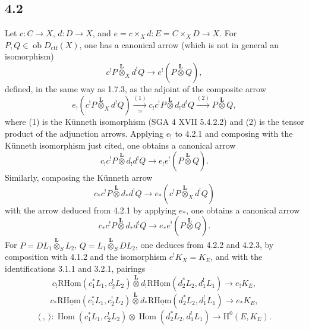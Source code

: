 \documentclass[11pt]{article}
\renewcommand{\H}{\mathrm{H}}
\DeclareMathOperator{\Hom}{Hom}
\newcommand{\ob}{\operatorname{ob}}
\providecommand{\Dctf}{D_{\mathrm{ctf}}}
\providecommand{\Dctf}{D_{\mathrm{ctf}}}
\providecommand{\Hom}{\operatorname{Hom}}
\providecommand{\ob}{\operatorname{ob}}
\providecommand{\Hom}{\operatorname{Hom}}
\begin{document}
\subsection*{4.2}
Let $c:C\to X$, $d:D\to X$, and $e=c\times_Xd:E=C\times_XD\to X$. For $P,Q\in\ob\Dctf(X)$, one has a canonical arrow (which is not in general an isomorphism)
\begin{equation}
c^!P\overset{\mathbf L}{\otimes}_X d^!Q
\longrightarrow e^!(P\overset{\mathbf L}{\otimes}Q),
\tag{4.2.1}
\end{equation}
defined, in the same way as 1.7.3, as the adjoint of the composite arrow
\[
e_!(c^!P\overset{\mathbf L}{\otimes}_X d^!Q)
\xrightarrow[\simeq]{(1)}
 c_!c^!P\overset{\mathbf L}{\otimes}d_!d^!Q
\xrightarrow{(2)} P\overset{\mathbf L}{\otimes}Q,
\]
where (1) is the Künneth isomorphism (SGA 4 XVII 5.4.2.2) and (2) is the tensor product of the adjunction arrows. Applying $e_!$ to 4.2.1 and composing with the Künneth isomorphism just cited, one obtains a canonical arrow
\begin{equation}
c_!c^!P\overset{\mathbf L}{\otimes}d_!d^!Q
\longrightarrow e_!e^!(P\overset{\mathbf L}{\otimes}Q).
\tag{4.2.2}
\end{equation}
Similarly, composing the Künneth arrow
\[
c_*c^!P\overset{\mathbf L}{\otimes}d_*d^!Q
\longrightarrow e_*(c^!P\overset{\mathbf L}{\otimes}_X d^!Q)
\]
with the arrow deduced from 4.2.1 by applying $e_*$, one obtains a canonical arrow
\begin{equation}
c_*c^!P\overset{\mathbf L}{\otimes}d_*d^!Q
\longrightarrow e_*e^!(P\overset{\mathbf L}{\otimes}Q).
\tag{4.2.3}
\end{equation}
For $P=DL_1\overset{\mathbf L}{\otimes}_S L_2$, $Q=L_1\overset{\mathbf L}{\otimes}_S DL_2$, one deduces from 4.2.2 and 4.2.3, by composition with 4.1.2 and the isomorphism $e^!K_X=K_E$, and with the identifications 3.1.1 and 3.2.1, pairings
\begin{equation}
c_!\mathrm{R}\underline{\mathrm{Hom}}(c_1^*L_1,c_2^!L_2)\overset{\mathbf L}{\otimes}
 d_!\mathrm{R}\underline{\mathrm{Hom}}(d_2^*L_2,d_1^!L_1)
\longrightarrow e_!K_E,
\tag{4.2.4}
\end{equation}
\begin{equation}
c_*\mathrm{R}\underline{\mathrm{Hom}}(c_1^*L_1,c_2^!L_2)\overset{\mathbf L}{\otimes}
 d_*\mathrm{R}\underline{\mathrm{Hom}}(d_2^*L_2,d_1^!L_1)
\longrightarrow e_*K_E,
\tag{4.2.4'}
\end{equation}
\begin{equation}
\langle\ ,\ \rangle:
\Hom(c_1^*L_1,c_2^!L_2)\otimes\Hom(d_2^*L_2,d_1^!L_1)
\longrightarrow \H^0(E,K_E).
\tag{4.2.5}
\end{equation}
\end{document}
